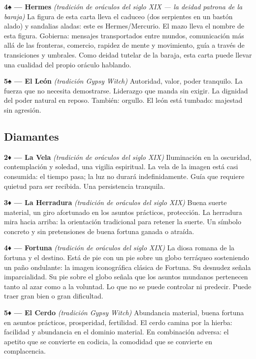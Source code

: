 \textbf{4♠ --- Hermes} \emph{(tradición de oráculos del siglo XIX --- la deidad patrona de la baraja)} La figura de esta carta lleva el caduceo (dos serpientes en un bastón alado) y sandalias aladas: este es Hermes/Mercurio. El mazo lleva el nombre de esta figura. Gobierna: mensajes transportados entre mundos, comunicación más allá de las fronteras, comercio, rapidez de mente y movimiento, guía a través de transiciones y umbrales. Como deidad tutelar de la baraja, esta carta puede llevar una cualidad del propio oráculo hablando.

\textbf{5♠ --- El León} \emph{(tradición Gypsy Witch)} Autoridad, valor, poder tranquilo. La fuerza que no necesita demostrarse. Liderazgo que manda sin exigir. La dignidad del poder natural en reposo. También: orgullo. El león está tumbado: majestad sin agresión.

\subsection{Diamantes}\label{diamonds}

\textbf{2♦ --- La Vela} \emph{(tradición de oráculos del siglo XIX)} Iluminación en la oscuridad, contemplación y soledad, una vigilia espiritual. La vela de la imagen está casi consumida: el tiempo pasa; la luz no durará indefinidamente. Guía que requiere quietud para ser recibida. Una persistencia tranquila.

\textbf{3♦ --- La Herradura} \emph{(tradición de oráculos del siglo XIX)} Buena suerte material, un giro afortunado en los asuntos prácticos, protección. La herradura mira hacia arriba: la orientación tradicional para retener la suerte. Un símbolo concreto y sin pretensiones de buena fortuna ganada o atraída.

\textbf{4♦ --- Fortuna} \emph{(tradición de oráculos del siglo XIX)} La diosa romana de la fortuna y el destino. Está de pie con un pie sobre un globo terráqueo sosteniendo un paño ondulante: la imagen iconográfica clásica de Fortuna. Su desnudez señala imparcialidad. Su pie sobre el globo señala que los asuntos mundanos pertenecen tanto al azar como a la voluntad. Lo que no se puede controlar ni predecir. Puede traer gran bien o gran dificultad.

\textbf{5♦ --- El Cerdo} \emph{(tradición Gypsy Witch)} Abundancia material, buena fortuna en asuntos prácticos, prosperidad, fertilidad. El cerdo camina por la hierba: facilidad y abundancia en el dominio material. En combinación adversa: el apetito que se convierte en codicia, la comodidad que se convierte en complacencia.

